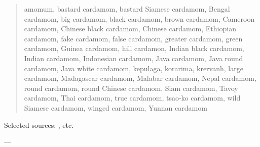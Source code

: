\documentclass[12pt]{article}
\begin{document}
\parencites{dalby_2000_dangerous}{prance_2005_cultural}


\begin{quote}
    amomum, bastard cardamom, bastard Siamese cardamom, Bengal cardamom, big cardamom, black cardamom, brown cardamom, Cameroon cardamom, Chinese black cardamom, Chinese cardamom, Ethiopian cardamom, fake cardamom, false cardamom, greater cardamom, green cardamom, Guinea cardamom, hill cardamon, Indian black cardamom, Indian cardamom, Indonesian cardamom, Java cardamom, Java round cardamom, Java white cardamom, kepulaga, korarima, krervanh, large cardamom, Madagascar cardamom, Malabar cardamom, Nepal cardamom, round cardamom, round Chinese cardamom, Siam cardamom, Tavoy cardamom, Thai cardamom, true cardamom, tsao-ko cardamom, wild Siamese cardamom, winged cardamom, Yunnan cardamom
\end{quote}

Selected sources: , etc.  




---
\end{document}
